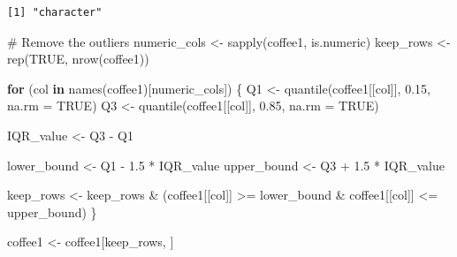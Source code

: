\documentclass[
  letterpaper,
  DIV=11,
  numbers=noendperiod]{scrartcl}
\newenvironment{Shaded}{\begin{snugshade}}{\end{snugshade}}
\newcommand{\AttributeTok}[1]{\textcolor[rgb]{0.40,0.45,0.13}{#1}}
\newcommand{\CommentTok}[1]{\textcolor[rgb]{0.37,0.37,0.37}{#1}}
\newcommand{\ConstantTok}[1]{\textcolor[rgb]{0.56,0.35,0.01}{#1}}
\newcommand{\ControlFlowTok}[1]{\textcolor[rgb]{0.00,0.23,0.31}{\textbf{#1}}}
\newcommand{\FloatTok}[1]{\textcolor[rgb]{0.68,0.00,0.00}{#1}}
\newcommand{\FunctionTok}[1]{\textcolor[rgb]{0.28,0.35,0.67}{#1}}
\newcommand{\NormalTok}[1]{\textcolor[rgb]{0.00,0.23,0.31}{#1}}
\newcommand{\OtherTok}[1]{\textcolor[rgb]{0.00,0.23,0.31}{#1}}
\newcommand{\SpecialCharTok}[1]{\textcolor[rgb]{0.37,0.37,0.37}{#1}}
\begin{document}
\begin{Shaded}
\end{Shaded}

\begin{verbatim}
[1] "character"
\end{verbatim}

\begin{Shaded}
\end{Shaded}

\begin{Shaded}
\begin{Highlighting}[]
\CommentTok{\# Remove the outliers}
\NormalTok{numeric\_cols }\OtherTok{\textless{}{-}} \FunctionTok{sapply}\NormalTok{(coffee1, is.numeric)}
\NormalTok{keep\_rows }\OtherTok{\textless{}{-}} \FunctionTok{rep}\NormalTok{(}\ConstantTok{TRUE}\NormalTok{, }\FunctionTok{nrow}\NormalTok{(coffee1))}

\ControlFlowTok{for}\NormalTok{ (col }\ControlFlowTok{in} \FunctionTok{names}\NormalTok{(coffee1)[numeric\_cols]) \{}
\NormalTok{  Q1 }\OtherTok{\textless{}{-}} \FunctionTok{quantile}\NormalTok{(coffee1[[col]], }\FloatTok{0.15}\NormalTok{, }\AttributeTok{na.rm =} \ConstantTok{TRUE}\NormalTok{)}
\NormalTok{  Q3 }\OtherTok{\textless{}{-}} \FunctionTok{quantile}\NormalTok{(coffee1[[col]], }\FloatTok{0.85}\NormalTok{, }\AttributeTok{na.rm =} \ConstantTok{TRUE}\NormalTok{)}
  
\NormalTok{  IQR\_value }\OtherTok{\textless{}{-}}\NormalTok{ Q3 }\SpecialCharTok{{-}}\NormalTok{ Q1}
  
\NormalTok{  lower\_bound }\OtherTok{\textless{}{-}}\NormalTok{ Q1 }\SpecialCharTok{{-}} \FloatTok{1.5} \SpecialCharTok{*}\NormalTok{ IQR\_value}
\NormalTok{  upper\_bound }\OtherTok{\textless{}{-}}\NormalTok{ Q3 }\SpecialCharTok{+} \FloatTok{1.5} \SpecialCharTok{*}\NormalTok{ IQR\_value}
  
\NormalTok{  keep\_rows }\OtherTok{\textless{}{-}}\NormalTok{ keep\_rows }\SpecialCharTok{\&}\NormalTok{ (coffee1[[col]] }\SpecialCharTok{\textgreater{}=}\NormalTok{ lower\_bound }\SpecialCharTok{\&}\NormalTok{ coffee1[[col]] }\SpecialCharTok{\textless{}=}\NormalTok{ upper\_bound)}
\NormalTok{\}}

\NormalTok{coffee1 }\OtherTok{\textless{}{-}}\NormalTok{ coffee1[keep\_rows, ]}
\end{Highlighting}
\end{Shaded}
\end{document}
